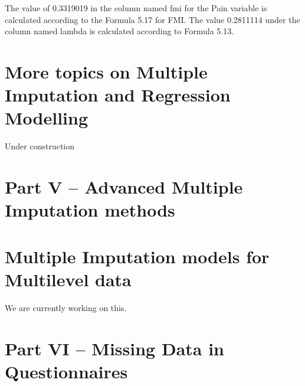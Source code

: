 \documentclass[]{book}
\newenvironment{Shaded}{\begin{snugshade}}{\end{snugshade}}
\newcommand{\CommentTok}[1]{\textcolor[rgb]{0.56,0.35,0.01}{\textit{#1}}}
\begin{document}
\begin{Shaded}
\end{Shaded}

The value of 0.3319019 in the column named fmi for the Pain variable is
calculated according to the Formula 5.17 for FMI. The value 0.2811114
under the column named lambda is calculated according to Formula 5.13.

\chapter{More topics on Multiple Imputation and Regression
Modelling}\label{more-topics-on-multiple-imputation-and-regression-modelling}

Under construction

\chapter*{Part V -- Advanced Multiple Imputation
methods}\label{part-v-advanced-multiple-imputation-methods}

\chapter{Multiple Imputation models for Multilevel
data}\label{multiple-imputation-models-for-multilevel-data}

We are currently working on this.

\chapter*{Part VI -- Missing Data in
Questionnaires}\label{part-vi-missing-data-in-questionnaires}
\end{document}
